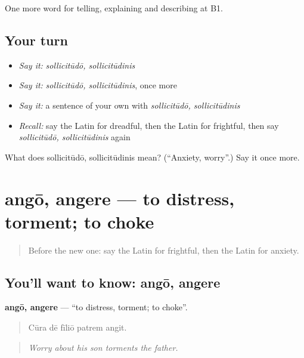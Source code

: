 \begin{grammarlens}[title={What you've built}]
One more word for telling, explaining and describing at B1.
\end{grammarlens}

\subsection*{Your turn}
\begin{itemize}
\raggedright
  \item \emph{Say it:} \emph{sollicitūdō, sollicitūdinis}
  \item \emph{Say it:} \emph{sollicitūdō, sollicitūdinis}, once more
  \item \emph{Say it:} a sentence of your own with \emph{sollicitūdō, sollicitūdinis}
  \item \emph{Recall:} say the Latin for dreadful, then the Latin for frightful, then say \emph{sollicitūdō, sollicitūdinis} again
\end{itemize}

\begin{tcolorbox}[breakable,colback=teal!4,colframe=teal!35!black,title={Before you move on}]
What does sollicitūdō, sollicitūdinis mean? (\textquotedblleft{}Anxiety, worry\textquotedblright{}.) Say it once more.
\end{tcolorbox}
\section[angō, angere]{angō, angere — to distress, torment; to choke}

\label{lesson:LA-C497-ango}



\begin{quote}
Before the new one: say the Latin for frightful, then the Latin for anxiety.
\end{quote}

\subsection*{You'll want to know: angō, angere}
\textbf{angō, angere} — \textquotedblleft{}to distress, torment; to choke\textquotedblright{}.

\begin{quote}
Cūra dē fīliō patrem angit.
\end{quote}

\begin{quote}
\emph{Worry about his son torments the father.}
\end{quote}

